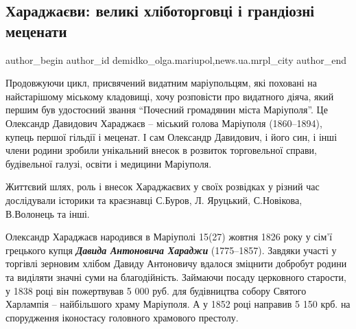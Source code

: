 
 
 
 
 
 
\subsection{Хараджаєви: великі хліботорговці і грандіозні меценати}
\label{sec:22_11_2021.stz.news.ua.mrpl_city.1.haradzhajevy_mecenaty}
 
\ifcmt
 author_begin
   author_id demidko_olga.mariupol,news.ua.mrpl_city
 author_end
\fi


Продовжуючи цикл, присвячений видатним маріупольцям, які поховані на
найстарішому міському кладовищі, хочу розповісти про видатного діяча, який
першим був удостоєний звання \enquote{Почесний громадянин міста Маріуполя}. Це
Олександр Давидович Хараджаєв – міський голова Маріуполя (1860–1894), купець
першої гільдії і меценат. І сам Олександр Давидович, і його син, і інші члени
родини зробили унікальний внесок в розвиток торговельної справи, будівельної
галузі, освіти і медицини Маріуполя.

Життєвий шлях, роль і внесок Хараджаєвих у своїх розвідках у різний час
дослідували історики та краєзнавці С.Буров, Л. Яруцький, С.Новікова, В.Волонець
та інші.

Олександр Хараджаєв народився в Маріуполі 15(27) жовтня 1826 року у сім'ї
грецького купця \textbf{\emph{Давида Антоновича Хараджи}} (1775–1857). Завдяки участі у
торгівлі зерновим хлібом Давиду Антоновичу вдалося зміцнити добробут родини та
виділяти значні суми на благодійність. Займаючи посаду церковного старости, у
1838 році він пожертвував 5 000 руб. для будівництва собору Святого Харлампія –
найбільшого храму Маріуполя. А у 1852 році направив 5 150 крб. на спорудження
іконостасу головного храмового престолу.

